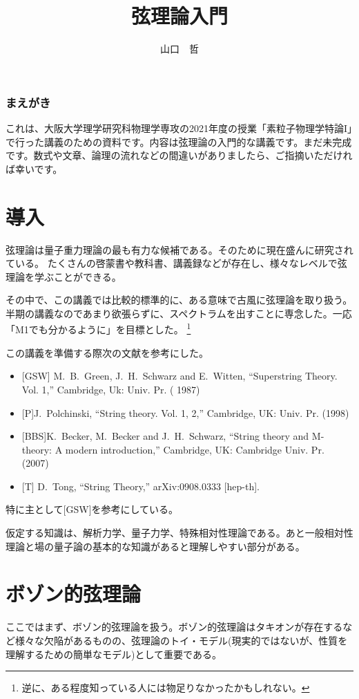 \documentclass[report,paper=a4, fontsize=12pt, line_length=16cm, number_of_lines=33,dvipdfmx]{jlreq}
\numberwithin{equation}{chapter}
\numberwithin{equation}{section}
\begin{document}
\title{弦理論入門}
\author{山口　哲}
\maketitle
\tableofcontents
\subsection*{まえがき}
これは、大阪大学理学研究科物理学専攻の2021年度の授業「素粒子物理学特論I」で行った講義のための資料です。内容は弦理論の入門的な講義です。まだ未完成です。数式や文章、論理の流れなどの間違いがありましたら、ご指摘いただければ幸いです。

\chapter{導入}
弦理論は量子重力理論の最も有力な候補である。そのために現在盛んに研究されている。
たくさんの啓蒙書や教科書、講義録などが存在し、様々なレベルで弦理論を学ぶことができる。

その中で、この講義では比較的標準的に、ある意味で古風に弦理論を取り扱う。半期の講義なのであまり欲張らずに、スペクトラムを出すことに専念した。一応「M1でも分かるように」を目標とした。
\footnote{逆に、ある程度知っている人には物足りなかったかもしれない。}

この講義を準備する際次の文献を参考にした。
\begin{itemize}
 \item {} [GSW] M.~B.~Green, J.~H.~Schwarz and E.~Witten,
  ``Superstring Theory. Vol. 1,''
  Cambridge, Uk: Univ. Pr. ( 1987) 
\item {}[P]J.~Polchinski,
  ``String theory. Vol. 1, 2,''
  Cambridge, UK: Univ. Pr. (1998)
 \item {}[BBS]K.~Becker, M.~Becker and J.~H.~Schwarz,
  ``String theory and M-theory: A modern introduction,''
  Cambridge, UK: Cambridge Univ. Pr. (2007)
\item {}[T] D.~Tong,
  ``String Theory,''
  arXiv:0908.0333 [hep-th].
\end{itemize}
特に主として[GSW]を参考にしている。

仮定する知識は、解析力学、量子力学、特殊相対性理論である。あと一般相対性理論と場の量子論の基本的な知識があると理解しやすい部分がある。
\chapter{ボゾン的弦理論}

ここではまず、ボゾン的弦理論を扱う。ボゾン的弦理論はタキオンが存在するなど様々な欠陥があるものの、弦理論のトイ・モデル(現実的ではないが、性質を理解するための簡単なモデル)として重要である。
\end{document}
